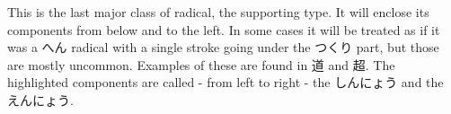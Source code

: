 This is the last major class of radical, the supporting type. It will enclose its components from below and to the left. In some cases it will be treated as if it was a へん radical with a single stroke going under the つくり part, but those are mostly uncommon. Examples of these are found in 道 and 超. The highlighted components are called - from left to right - the しんにょう and the えんにょう.

\begin{figure}[H]\label{fig:PR;漢字;部首;にょう}
	\centering
	
	\hspace{0.5in}
	
\end{figure}